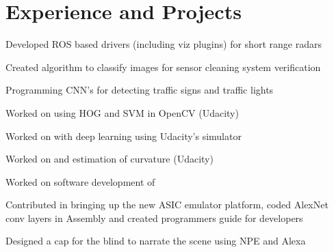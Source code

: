 \documentclass[]{resume-openfont}
\begin{document}
\begin{minipage}[t]{0.63\textwidth} 


\section{Experience and Projects}

\vspace{\topsep} %
\begin{tightemize}
\item Developed ROS based drivers (including viz plugins) for short range radars 
\item Created algorithm to classify images for sensor cleaning system verification 
\item Programming CNN's for detecting traffic signs and traffic lights 
\item Worked on  \href{https://github.com/TusharChugh/Vehicle-Detection-HOG}{} using HOG and SVM in OpenCV (Udacity)
\item Worked on \href{https://github.com/TusharChugh/CarND-Behavioral-Cloning-P3} {} with deep learning using Udacity's simulator
\item Worked on \href{https://github.com/TusharChugh/LaneFinding}{} and estimation of curvature (Udacity)
\end{tightemize}
\sectionsep

\begin{tightemize}
\item  Worked on software development of  \href{https://developer.qualcomm.com/software/snapdragon-neural-processing-engine}{}
\item Contributed in bringing up the new ASIC emulator platform, coded AlexNet conv layers in Assembly and created programmers guide  for developers
\item Designed a cap for the blind to narrate the scene using NPE and Alexa

\end{tightemize}
\sectionsep


\end{minipage}
\end{document}
